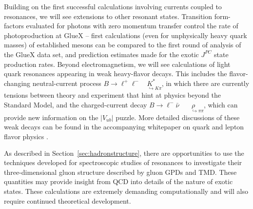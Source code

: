 Building on the first successful calculations involving currents coupled to resonances, we will see extensions to other resonant states. Transition form-factors evaluated for photons with zero momentum transfer control the rate of photoproduction at GlueX -- first calculations (even for unphysically heavy quark masses) of established mesons can be compared to the first round of analysis of the GlueX data set, and prediction estimates made for the exotic $J^{PC}$ state production rates. Beyond electromagnetism, we will see calculations of light quark resonances appearing in weak heavy-flavor decays. This includes the flavor-changing neutral-current process $B \to \ell^+\ell^- \!\!\!\! \underset{\;\;\;\;\;\hookrightarrow K\pi}{K^*}$, in which there are currently tensions between theory and experiment that hint at physics beyond the Standard Model, and the charged-current decay $B \to \ell^-\bar{\nu}  \!\!\!\!\!\!\!\!\;\;\underset{\;\;\;\;\;\;\hookrightarrow \pi\pi}{\rho}$, which can provide new information on the $|V_{ub}|$ puzzle. More detailed discussions of these weak decays can be found in
the accompanying whitepaper on quark and lepton flavor physics \cite{wphep}.




As described in Section~\ref{sec:hadronstructure}, there are opportunities to use the techniques developed for spectroscopic studies of resonances to investigate their three-dimensional gluon structure described by gluon GPDs and TMD. These quantities may provide insight from QCD into details of the nature of exotic states. These calculations are extremely demanding computationally and will also require continued theoretical development.






